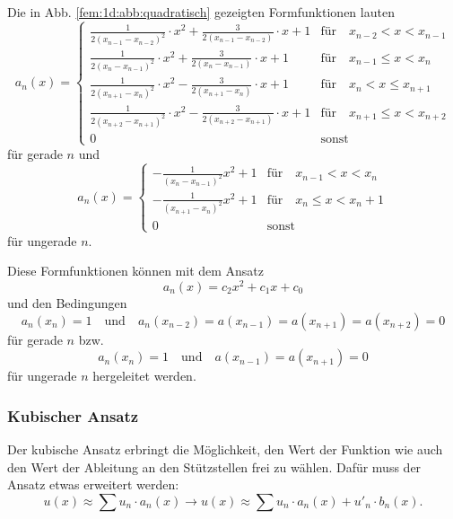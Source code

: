 Die in Abb. \ref{fem:1d:abb:quadratisch} gezeigten Formfunktionen lauten
\begin{equation}
    a_n(x) = \left\{ \begin{array}{ll}
        \frac{1}{2(x_{n-1} - x_{n-2})^2} \cdot x^2 + \frac{3}{2 (x_{n-1} - x_{n-2})} \cdot x + 1  
            & \text{für} \quad x_{n-2} < x < x_{n-1} \\
        \frac{1}{2(x_{n} - x_{n-1})^2} \cdot x^2 + \frac{3}{2 (x_{n} - x_{n-1})} \cdot x + 1  
            & \text{für} \quad x_{n-1} \leq x < x_n \\
        \frac{1}{2(x_{n+1} - x_{n})^2} \cdot x^2 - \frac{3}{2 (x_{n+1} - x_{n})} \cdot x + 1
            & \text{für} \quad x_n < x \leq x_{n+1} \\
        \frac{1}{2(x_{n+2} - x_{n+1})^2} \cdot x^2 - \frac{3}{2 (x_{n+2} - x_{n+1})} \cdot x + 1
            & \text{für} \quad x_{n+1} \leq x < x_{n+2} \\
        0
            & \text{sonst}
    \end{array} \right.
\end{equation}
für gerade $n$ und
\begin{equation}
    a_n(x) = \left\{ \begin{array}{ll}
        -\frac{1}{(x_n - x_{n-1})^2} x^2 + 1 
            & \text{für} \quad x_{n-1} < x < x_n \\
        -\frac{1}{(x_{n+1} - x_n)^2} x^2 + 1 
            & \text{für} \quad x_n \leq x < x_n+1 \\
        0 
            & \text{sonst}
    \end{array} \right.
\end{equation}
für ungerade $n$.

Diese Formfunktionen können mit dem Ansatz 
\begin{equation}
    a_n(x) = c_2x^2 + c_1x + c_0
\end{equation}
und den Bedingungen 
\begin{equation}
        a_n(x_n) = 1 
        \quad \text{und} \quad 
        a_n(x_{n-2}) = a(x_{n-1}) = a(x_{n+1}) = a(x_{n+2}) = 0
\end{equation}
für gerade $n$ bzw.
\begin{equation}
        a_n(x_n) = 1 
        \quad \text{und} \quad
        a(x_{n-1}) = a(x_{n+1}) = 0
\end{equation}
für ungerade $n$ hergeleitet werden.

\subsubsection{Kubischer Ansatz}
Der kubische Ansatz erbringt die Möglichkeit, den Wert der Funktion wie auch den Wert der Ableitung an den Stützstellen frei zu wählen.
Dafür muss der Ansatz etwas erweitert werden:
\begin{equation}
    u(x) \approx \sum{u_n \cdot a_n(x)} \rightarrow u(x) \approx \sum{u_n \cdot a_n(x) + u'_n \cdot b_n(x)}.
\end{equation}

